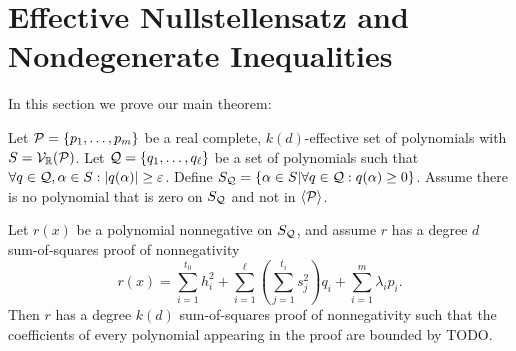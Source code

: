 \section{Effective Nullstellensatz and Nondegenerate Inequalities}
\label{sec:main}

In this section we prove our main theorem:

\begin{theorem}\label{thm:main}
Let $\mathcal P = \{p_1,\dots,p_m\}$ be a real complete, $k(d)$-effective set of polynomials with $S = \mathcal V_\mathbb R(\mathcal P)$. Let $\mathcal Q = \{q_1, \dots, q_\ell\}$ be a set of polynomials such that $\forall q \in \mathcal Q, \alpha \in S: |q(\alpha)| \geq \varepsilon$. Define $S_{\mathcal Q} = \{\alpha \in S | \forall q \in \mathcal Q: q(\alpha) \geq 0\}$. Assume there is no polynomial that is zero on $S_{\mathcal Q}$ and not in $\langle \mathcal P\rangle$. 

Let $r(x)$ be a polynomial nonnegative on $S_{\mathcal Q}$, and assume $r$ has a degree $d$ sum-of-squares proof of nonnegativity 
\[r(x) = \sum_{i=1}^{t_0} h_i^2 + \sum_{i=1}^\ell \left(\sum_{j=1}^{t_i} s_j^2\right) q_i + \sum_{i=1}^m \lambda_i p_i.\] 
Then $r$ has a degree $k(d)$ sum-of-squares proof of nonnegativity such that the coefficients of every polynomial appearing in the proof are bounded by TODO.
\end{theorem}
